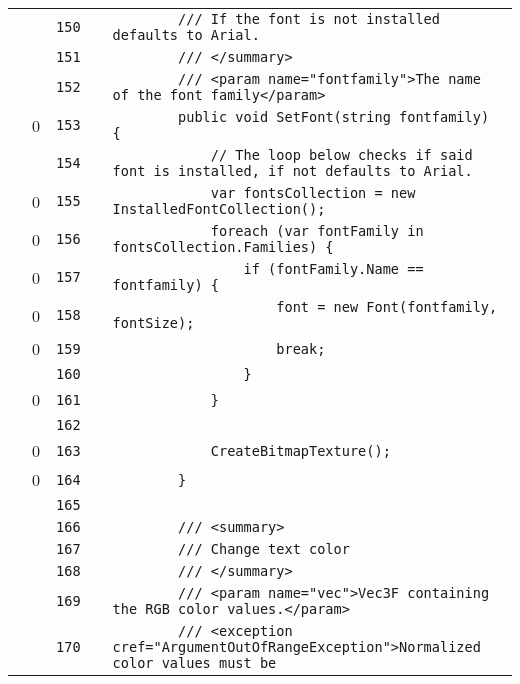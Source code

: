\documentclass[a4paper,landscape,10pt]{article}
\begin{document}
\begin{longtable}[l]{lrrll}
\cellcolor{gray} &  & \verb~150~ & & \verb~        /// If the font is not installed defaults to Arial.~\\
\cellcolor{gray} &  & \verb~151~ & & \verb~        /// </summary>~\\
\cellcolor{gray} &  & \verb~152~ & & \verb~        /// <param name="fontfamily">The name of the font family</param>~\\
\cellcolor{red} & 0 & \verb~153~ & & \verb~        public void SetFont(string fontfamily) {~\\
\cellcolor{gray} &  & \verb~154~ & & \verb~            // The loop below checks if said font is installed, if not defaults to Arial.~\\
\cellcolor{red} & 0 & \verb~155~ & & \verb~            var fontsCollection = new InstalledFontCollection();~\\
\cellcolor{red} & 0 & \verb~156~ & & \verb~            foreach (var fontFamily in fontsCollection.Families) {~\\
\cellcolor{red} & 0 & \verb~157~ & & \verb~                if (fontFamily.Name == fontfamily) {~\\
\cellcolor{red} & 0 & \verb~158~ & & \verb~                    font = new Font(fontfamily, fontSize);~\\
\cellcolor{red} & 0 & \verb~159~ & & \verb~                    break;~\\
\cellcolor{gray} &  & \verb~160~ & & \verb~                }~\\
\cellcolor{red} & 0 & \verb~161~ & & \verb~            }~\\
\cellcolor{gray} &  & \verb~162~ & & \verb~~\\
\cellcolor{red} & 0 & \verb~163~ & & \verb~            CreateBitmapTexture();~\\
\cellcolor{red} & 0 & \verb~164~ & & \verb~        }~\\
\cellcolor{gray} &  & \verb~165~ & & \verb~~\\
\cellcolor{gray} &  & \verb~166~ & & \verb~        /// <summary>~\\
\cellcolor{gray} &  & \verb~167~ & & \verb~        /// Change text color~\\
\cellcolor{gray} &  & \verb~168~ & & \verb~        /// </summary>~\\
\cellcolor{gray} &  & \verb~169~ & & \verb~        /// <param name="vec">Vec3F containing the RGB color values.</param>~\\
\cellcolor{gray} &  & \verb~170~ & & \verb~        /// <exception cref="ArgumentOutOfRangeException">Normalized color values must be~\\

\end{longtable}
\end{document}
